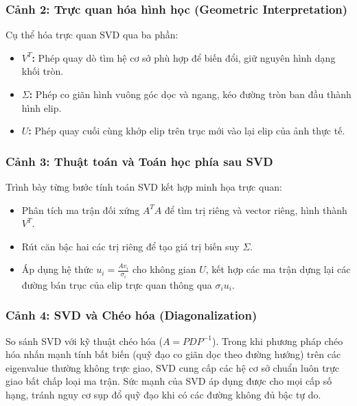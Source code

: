 \subsubsection{Cảnh 2: Trực quan hóa hình học (Geometric Interpretation)}
Cụ thể hóa trực quan SVD qua ba phần:
\begin{itemize}
    \item \textbf{$V^T$:} Phép quay dò tìm hệ cơ sở phù hợp để biến đổi, giữ nguyên hình dạng khối tròn.
    \item \textbf{$\Sigma$:} Phép co giãn hình vuông góc dọc và ngang, kéo đường tròn ban đầu thành hình elip.
    \item \textbf{$U$:} Phép quay cuối cùng khớp elip trên trục mới vào lại elip của ảnh thực tế.
\end{itemize}

\subsubsection{Cảnh 3: Thuật toán và Toán học phía sau SVD}
Trình bày từng bước tính toán SVD kết hợp minh họa trực quan:
\begin{itemize}
    \item Phân tích ma trận đối xứng $A^T A$ để tìm trị riêng và vector riêng, hình thành $V^T$.
    \item Rút căn bậc hai các trị riêng để tạo giá trị biến suy $\Sigma$.
    \item Áp dụng hệ thức $u_i = \frac{A v_i}{\sigma_i}$ cho không gian $U$, kết hợp các ma trận dựng lại các đường bán trục của elip trực quan thông qua $\sigma_i u_i$.
\end{itemize}

\subsubsection{Cảnh 4: SVD và Chéo hóa (Diagonalization)}
So sánh SVD với kỹ thuật chéo hóa ($A = P D P^{-1}$). Trong khi phương pháp chéo hóa nhấn mạnh tính bất biến (quỹ đạo co giãn dọc theo đường hướng) trên các eigenvalue thường không trực giao, SVD cung cấp các hệ cơ sở chuẩn luôn trực giao bất chấp loại ma trận. Sức mạnh của SVD áp dụng được cho mọi cấp số hạng, tránh nguy cơ sụp đổ quỹ đạo khi có các đường không đủ bậc tự do.